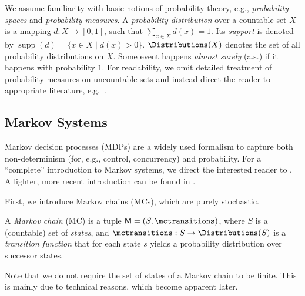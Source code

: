 \documentclass{theoretics}
\newcommand{\distribution}{d}
\newcommand{\MC}{\mathsf{M}}
\newcommand{\States}{S}
\DeclareMathOperator{\support}{supp}
\begin{document}
We assume familiarity with basic notions of probability theory, e.g., \emph{probability spaces} and \emph{probability measures}.
A \emph{probability distribution} over a countable set $X$ is a mapping $\distribution : X \to [0,1]$, such that $\sum_{x \in X} \distribution(x) = 1$.
Its \emph{support} is denoted by $\support(\distribution) = \{x \in X \mid \distribution(x) > 0\}$.
$\Distributions(X)$ denotes the set of all probability distributions on $X$.
Some event happens \emph{almost surely} (a.s.) if it happens with probability $1$.
For readability, we omit detailed treatment of probability measures on uncountable sets and instead direct the reader to appropriate literature, e.g.\ \cite{billingsley2008probability}.
\subsection{Markov Systems}
Markov decision processes (MDPs) are a widely used formalism to capture both non-determinism (for, e.g., control, concurrency) and probability.
For a \enquote{complete} introduction to Markov systems, we direct the interested reader to \cite{DBLP:books/wi/Puterman94,kallenberg2011markov}.
A lighter, more recent introduction can be found in \cite[Chapter~2]{DBLP:phd/dnb/Meggendorfer21}.

First, we introduce Markov chains (MCs), which are purely stochastic.
\begin{definition}
	A \emph{Markov chain} (MC) is a tuple $\MC = (\States, \mctransitions)$, where
		$\States$ is a (countable) set of \emph{states}, and
		$\mctransitions : \States \to \Distributions(\States)$ is a \emph{transition function} that for each state $s$ yields a probability distribution over successor states.
\end{definition}
Note that we do not require the set of states of a Markov chain to be finite.
This is mainly due to technical reasons, which become apparent later.
\end{document}
